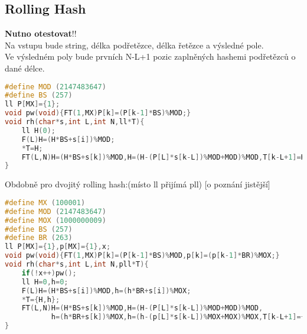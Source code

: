 \documentclass[11pt]{article}
\begin{document}
\subsection{Rolling Hash}
\textbf{Nutno otestovat}!!
\\Na vstupu bude string, délka podřetězce, délka řetězce a výsledné pole.
\\Ve výsledném poly bude prvních \textsf{N-L+1} pozic zaplněných hashemi podřetězců o dané délce.
\begin{lstlisting}[language=C++]
#define MOD (2147483647)
#define BS (257)
ll P[MX]={1};
void pw(void){FT(1,MX)P[k]=(P[k-1]*BS)%MOD;}
void rh(char*s,int L,int N,ll*T){
    ll H(0);
    F(L)H=(H*BS+s[i])%MOD;
    *T=H;
    FT(L,N)H=(H*BS+s[k])%MOD,H=(H-(P[L]*s[k-L])%MOD+MOD)%MOD,T[k-L+1]=H;//TODO
}
\end{lstlisting}
Obdobně pro dvojitý rolling hash:(místo \textsf{ll} přijímá \textsf{pll}) [o poznání jistější]
\begin{lstlisting}[language=C++]
#define MX (100001)
#define MOD (2147483647)
#define MOX (1000000009)
#define BS (257)
#define BR (263)
ll P[MX]={1},p[MX]={1},x;
void pw(void){FT(1,MX)P[k]=(P[k-1]*BS)%MOD,p[k]=(p[k-1]*BR)%MOX;}
void rh(char*s,int L,int N,pll*T){
    if(!x++)pw();
    ll H=0,h=0;
    F(L)H=(H*BS+s[i])%MOD,h=(h*BR+s[i])%MOX;
    *T={H,h};
    FT(L,N)H=(H*BS+s[k])%MOD,H=(H-(P[L]*s[k-L])%MOD+MOD)%MOD,
           h=(h*BR+s[k])%MOX,h=(h-(p[L]*s[k-L])%MOX+MOX)%MOX,T[k-L+1]={H,h};
}
\end{lstlisting}
\end{document}
